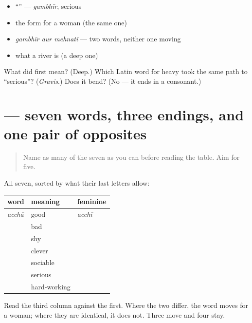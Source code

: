 \begin{itemize}
\raggedright
  \item \textquotedblleft{}\textquotedblright{} — \emph{gambhīr}, serious
  \item the form for a woman (the same one)
  \item \emph{gambhīr aur mehnatī} — two words, neither one moving
  \item what a \textbf{} river is (a deep one)
\end{itemize}

\begin{tcolorbox}[breakable,colback=teal!4,colframe=teal!35!black,title={Before you move on}]
What did \textbf{} first mean? (Deep.) Which Latin word for heavy took the same path to \textquotedblleft{}serious\textquotedblright{}? (\emph{Gravis}.) Does it bend? (No — it ends in a consonant.)
\end{tcolorbox}
\section[\texorpdfstring{\hi{सात} \hi{शब्द} \hi{स्वभाव} \hi{के} (sāt śabd svabhāv ke)}{सात शब्द स्वभाव के (sāt śabd svabhāv ke)}]{    — seven words, three endings, and one pair of opposites}

\label{lesson:HI-C83-repaso-svabhaav}



\begin{quote}
Name as many of the seven as you can before reading the table. Aim for five.
\end{quote}

\begin{grammarlens}[title={Grammar Lens: the ending decides, and the meaning never does}]
All seven, sorted by what their last letters allow:

\noindent
\begin{tabularx}{\linewidth}{@{}>{\raggedright\arraybackslash}X>{\raggedright\arraybackslash}X>{\raggedright\arraybackslash}X@{}}
\toprule
\textbf{word} & \textbf{meaning} & \textbf{feminine} \\
\midrule
\emph{acchā} & good & \emph{acchī} \\
\hi{बुरा} & bad & \hi{बुरी} \\
\hi{शर्मीला} & shy & \hi{शर्मीली} \\
\hi{होशियार} & clever & \hi{होशियार} \\
\hi{मिलनसार} & sociable & \hi{मिलनसार} \\
\hi{गंभीर} & serious & \hi{गंभीर} \\
\hi{मेहनती} & hard-working & \hi{मेहनती} \\
\bottomrule
\end{tabularx}

Read the third column against the first. Where the two differ, the word moves for a woman; where they are identical, it does not. Three move and four stay.
\end{grammarlens}

